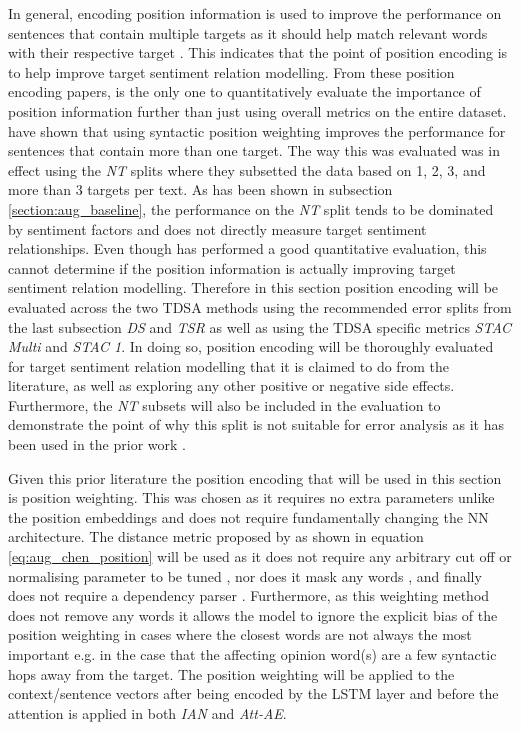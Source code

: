 In general, encoding position information is used to improve the performance on sentences that contain multiple targets as it should help match relevant words with their respective target \citep{li-etal-2018-hierarchical, he-etal-2018-effective}. This indicates that the point of position encoding is to help improve target sentiment relation modelling. From these position encoding papers, \citet{he-etal-2018-effective} is the only one to quantitatively evaluate the importance of position information further than just using overall metrics on the entire dataset. \citet{he-etal-2018-effective} have shown that using syntactic position weighting improves the performance for sentences that contain more than one target. The way this was evaluated was in effect using the \textit{NT} splits where they subsetted the data based on 1, 2, 3, and more than 3 targets per text. As has been shown in subsection \ref{section:aug_baseline}, the performance on the \textit{NT} split tends to be dominated by sentiment factors and does not directly measure target sentiment relationships. Even though \citet{he-etal-2018-effective} has performed a good quantitative evaluation, this cannot determine if the position information is actually improving target sentiment relation modelling. Therefore in this section position encoding will be evaluated across the two TDSA methods using the recommended error splits from the last subsection \textit{DS} and \textit{TSR} as well as using the TDSA specific metrics \textit{STAC Multi} and \textit{STAC 1}. In doing so, position encoding will be thoroughly evaluated for target sentiment relation modelling that it is claimed to do from the literature, as well as exploring any other positive or negative side effects. Furthermore, the \textit{NT} subsets will also be included in the evaluation to demonstrate the point of why this split is not suitable for error analysis as it has been used in the prior work \citep{he-etal-2018-effective}. 

Given this prior literature the position encoding that will be used in this section is position weighting. This was chosen as it requires no extra parameters unlike the position embeddings and does not require fundamentally changing the NN architecture. The distance metric proposed by \citet{chen-etal-2017-recurrent} as shown in equation \ref{eq:aug_chen_position} will be used as it does not require any arbitrary cut off or normalising parameter to be tuned \citep{zhao2019modeling, li-etal-2018-transformation}, nor does it mask any words \citep{zhang-etal-2019-aspect}, and finally does not require a dependency parser \citep{he-etal-2018-effective}. Furthermore, as this weighting method does not remove any words it allows the model to ignore the explicit bias of the position weighting in cases where the closest words are not always the most important e.g. in the case that the affecting opinion word(s) are a few syntactic hops away from the target. The position weighting will be applied to the context/sentence vectors after being encoded by the LSTM layer and before the attention is applied in both \textit{IAN} and \textit{Att-AE}.

